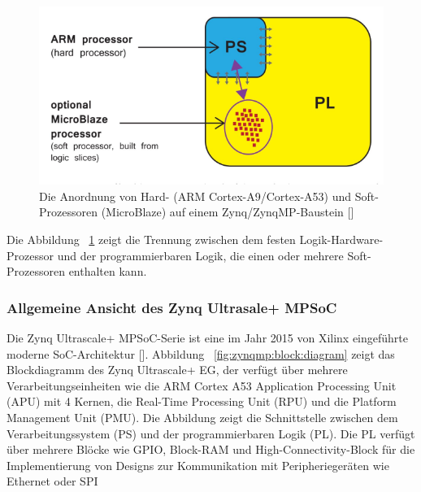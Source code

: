 \begin{figure}[h]
	\begin{center}
		\includegraphics[width=1\textwidth]{./images/ps-pl.jpg}
	\end{center}
	\vspace{-5pt}
	\caption[Hard-(ARM Cortex-A9/Cortex-A53) und Soft-Prozessoren (MicroBlaze)]{Die Anordnung von Hard- (ARM Cortex-A9/Cortex-A53) und Soft-Prozessoren (MicroBlaze) auf einem Zynq/ZynqMP-Baustein [\cite{Crockett:2001018}]}  %
	\label{fig:pl:ps}
	\vspace{-5pt}
\end{figure}


Die Abbildung ~\ref{fig:pl:ps} zeigt die Trennung zwischen dem festen Logik-Hardware-Prozessor und der programmierbaren Logik, die einen oder mehrere Soft-Prozessoren enthalten kann. 

\subsubsection{Allgemeine Ansicht des Zynq Ultrasale+ MPSoC}
Die Zynq Ultrascale+ MPSoC-Serie ist eine im Jahr 2015 von Xilinx eingeführte moderne SoC-Architektur [\cite{CNXSoftware}]. Abbildung ~\ref{fig:zynqmp:block:diagram} zeigt das Blockdiagramm des Zynq Ultrascale+ EG, der verfügt über mehrere Verarbeitungseinheiten wie die ARM Cortex A53 Application Processing Unit (APU) mit 4 Kernen, die Real-Time Processing Unit (RPU) und die Platform Management Unit (PMU). Die Abbildung zeigt die Schnittstelle zwischen dem Verarbeitungssystem (PS) und der programmierbaren Logik (PL). Die PL verfügt über mehrere Blöcke wie GPIO, Block-RAM und High-Connectivity-Block für die Implementierung von Designs zur Kommunikation mit Peripheriegeräten wie Ethernet oder SPI

